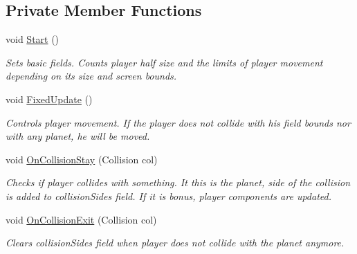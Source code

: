 \subsection*{Private Member Functions}
\begin{DoxyCompactItemize}
\item 
void \mbox{\hyperlink{class_move_aea23c11a3be7cd82d739e051aa9a7ae2}{Start}} ()
\begin{DoxyCompactList}\small\item\em Sets basic fields. Counts player half size and the limits of player movement depending on its size and screen bounds. \end{DoxyCompactList}\item 
void \mbox{\hyperlink{class_move_aa993ca0c0450f5ad56c7d09aaabb6832}{Fixed\+Update}} ()
\begin{DoxyCompactList}\small\item\em Controls player movement. If the player does not collide with his field bounds nor with any planet, he will be moved. \end{DoxyCompactList}\item 
void \mbox{\hyperlink{class_move_ac2bfaf00595a43fa315564a9bf25dd91}{On\+Collision\+Stay}} (Collision col)
\begin{DoxyCompactList}\small\item\em Checks if player collides with something. It this is the planet, side of the collision is added to collision\+Sides field. If it is bonus, player components are updated. \end{DoxyCompactList}\item 
void \mbox{\hyperlink{class_move_a49017f3ca3f73afbff88f4b79fb89d37}{On\+Collision\+Exit}} (Collision col)
\begin{DoxyCompactList}\small\item\em Clears collision\+Sides field when player does not collide with the planet anymore. \end{DoxyCompactList}\end{DoxyCompactItemize}
